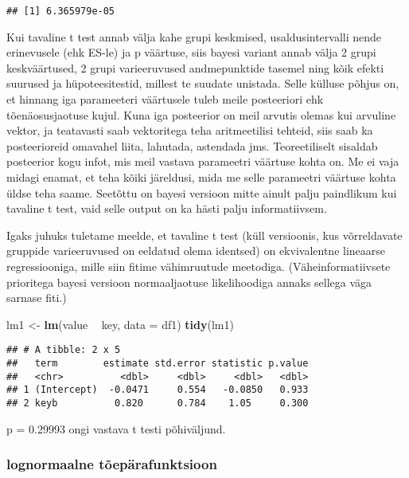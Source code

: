 \documentclass[]{article}
\newenvironment{Shaded}{\begin{snugshade}}{\end{snugshade}}
\newcommand{\KeywordTok}[1]{\textcolor[rgb]{0.13,0.29,0.53}{\textbf{#1}}}
\newcommand{\DataTypeTok}[1]{\textcolor[rgb]{0.13,0.29,0.53}{#1}}
\newcommand{\StringTok}[1]{\textcolor[rgb]{0.31,0.60,0.02}{#1}}
\newcommand{\OperatorTok}[1]{\textcolor[rgb]{0.81,0.36,0.00}{\textbf{#1}}}
\newcommand{\NormalTok}[1]{#1}
\begin{document}
\begin{verbatim}
## [1] 6.365979e-05
\end{verbatim}

Kui tavaline t test annab välja kahe grupi keskmised, usaldusintervalli
nende erinevusele (ehk ES-le) ja p väärtuse, siis bayesi variant annab
välja 2 grupi keskväärtused, 2 grupi varieeruvused andmepunktide tasemel
ning kõik efekti suurused ja hüpoteesitestid, millest te suudate
unistada. Selle külluse põhjus on, et hinnang iga parameeteri väärtusele
tuleb meile posteeriori ehk tõenäosusjaotuse kujul. Kuna iga posteerior
on meil arvutis olemas kui arvuline vektor, ja teatavasti saab
vektoritega teha aritmeetilisi tehteid, siis saab ka posteerioreid
omavahel liita, lahutada, astendada jms. Teoreetiliselt sisaldab
posteerior kogu infot, mis meil vastava parameetri väärtuse kohta on. Me
ei vaja midagi enamat, et teha kõiki järeldusi, mida me selle parameetri
väärtuse kohta üldse teha saame. Seetõttu on bayesi versioon mitte
ainult palju paindlikum kui tavaline t test, vaid selle output on ka
hästi palju informatiivsem.

Igaks juhuks tuletame meelde, et tavaline t test (küll versioonis, kus
võrreldavate gruppide varieeruvused on eeldatud olema identsed) on
ekvivalentne lineaarse regressiooniga, mille siin fitime vähimruutude
meetodiga. (Väheinformatiivsete prioritega bayesi versioon
normaaljaotuse likelihoodiga annaks sellega väga sarnase fiti.)

\begin{Shaded}
\begin{Highlighting}[]
\NormalTok{lm1 <-}\StringTok{ }\KeywordTok{lm}\NormalTok{(value }\OperatorTok{~}\StringTok{ }\NormalTok{key, }\DataTypeTok{data =}\NormalTok{ df1)}
\KeywordTok{tidy}\NormalTok{(lm1)}
\end{Highlighting}
\end{Shaded}

\begin{verbatim}
## # A tibble: 2 x 5
##   term        estimate std.error statistic p.value
##   <chr>          <dbl>     <dbl>     <dbl>   <dbl>
## 1 (Intercept)  -0.0471     0.554   -0.0850   0.933
## 2 keyb          0.820      0.784    1.05     0.300
\end{verbatim}

p = 0.29993 ongi vastava t testi põhiväljund.

\subsubsection{lognormaalne
tõepärafunktsioon}\label{lognormaalne-toeparafunktsioon}
\end{document}
